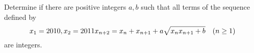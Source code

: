 Determine if there are positive integers $a, b$ such that all terms of the sequence defined by\[ x_{1}= 2010,x_{2}= 2011\\  x_{n+2}= x_{n}+ x_{n+1}+a\sqrt{x_{n}x_{n+1}+b}\quad (n\ge 1) \] are integers.